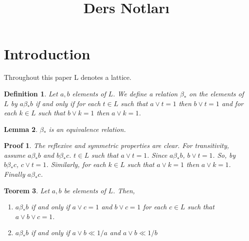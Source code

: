 \documentclass[a4paper,12pt]{article}
\title{Ders Notları}
\date{}
\numberwithin{equation}{section}
\theoremstyle{italik}
\newtheorem{teorem}{Teorem}[section]
\newtheorem{lemma}[teorem]{Lemma}
\newtheorem{tanim}[teorem]{Definition}
\newtheorem*{ispat}{Proof}
\begin{document}
\section{Introduction}
Throughout this paper L denotes a lattice.

\begin{tanim} \label{1}
  Let $ a,b $ elements of $ L $. We define a relation $ \beta_* $ on the elements of $ L $ by 
  $ a \beta_* b $ if and only if for each $ t \in L $ such that $ a \vee t = 1 $ then $ b \vee t = 1 $ and for each 
  $ k \in L $ such that $ b \vee k = 1 $ then $ a \vee k = 1 $.
\end{tanim}

\begin{lemma} \label{2}
  $ \beta_* $ is an equivalence relation.
\end{lemma}
\begin{ispat}
  The reflexive and symmetric properties are clear. For transitivity, assume $ a \beta_*b $ and $ b \beta_* c $. 
  $ t \in L $ such that $ a \vee t = 1 $. Since $ a \beta_*b $, $ b \vee t = 1 $. So,  by $ b \beta_* c $, 
  $ c \vee t = 1 $. Similarly, for each $ k \in L $ such that $ a \vee k = 1 $ then $ a \vee k=1 $. 
  Finally $ a \beta_* c $.

\end{ispat}

\begin{teorem} \label{3}
  Let $ a,b $ be elements of $ L $. Then,
  \begin{enumerate}[label=(\roman{*}), ref=(\roman{*})]

      \item
          $ a \beta_* b $ if and only if $ a \vee c = 1 $ and $ b \vee c = 1 $ for each $ c \in L $ 
      such that $ a \vee b  \vee c = 1 $.  \label{3.1}

    \item
      $ a \beta_* b $ if and only if $ a \vee b \ll 1/a $ and $ a \vee b \ll 1/b $  \label{3.2}

  \end{enumerate}
\end{teorem}
\end{document}
